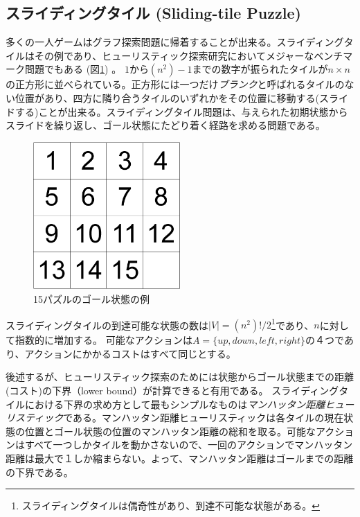 \documentclass[10pt]{book}
\begin{document}
\subsection{スライディングタイル (Sliding-tile Puzzle)}

多くの一人ゲームはグラフ探索問題に帰着することが出来る。スライディングタイルはその例であり、ヒューリスティック探索研究においてメジャーなベンチマーク問題でもある (図\ref{fig:15-puzzle}) \cite{johnson1879notes}。
$1$から$(n^2)-1$までの数字が振られたタイルが$n\times n$の正方形に並べられている。正方形には一つだけ{\it ブランク}と呼ばれるタイルのない位置があり、四方に隣り合うタイルのいずれかをその位置に移動する(スライドする)ことが出来る。スライディングタイル問題は、与えられた初期状態からスライドを繰り返し、ゴール状態にたどり着く経路を求める問題である。

\begin{figure}
\centering
\includegraphics[bb=0 0 372 373,width=0.5\textwidth]{figures/15-puzzle.png}
\caption{15パズルのゴール状態の例}
\label{fig:15-puzzle}
\end{figure}


スライディングタイルの到達可能な状態の数は$|V| = (n^2)!/2$\footnote{スライディングタイルは偶奇性があり、到達不可能な状態がある\cite{johnson1879notes}。}であり、$n$に対して指数的に増加する。
可能なアクションは$A= \{up, down, left, right\}$の４つであり、アクションにかかるコストはすべて同じとする。

後述するが、ヒューリスティック探索のためには状態からゴール状態までの距離(コスト)の下界（lower bound）が計算できると有用である。
スライディングタイルにおける下界の求め方として最もシンプルなものは{\it マンハッタン距離ヒューリスティック}である。マンハッタン距離ヒューリスティックは各タイルの現在状態の位置とゴール状態の位置のマンハッタン距離の総和を取る。可能なアクションはすべて一つしかタイルを動かさないので、一回のアクションでマンハッタン距離は最大で１しか縮まらない。よって、マンハッタン距離はゴールまでの距離の下界である。
\end{document}
